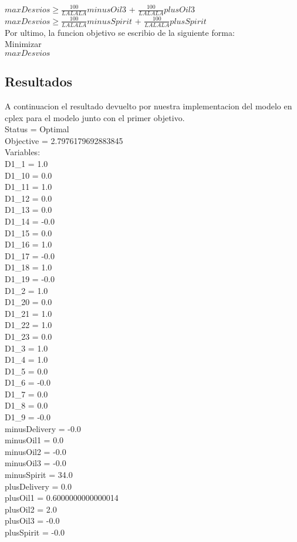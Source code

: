 $maxDesvios \geq \frac{100}{LALALA} minusOil3$ +
$\frac{100}{LALALA} plusOil3$ \\


$maxDesvios \geq \frac{100}{LALALA} minusSpirit$ +
$\frac{100}{LALALA} plusSpirit$ \\

 Por ultimo, la funcion objetivo se escribio de la siguiente forma: \\

 Minimizar\\
 $maxDesvios$

\newpage
\subsection{Resultados}

A continuacion el resultado devuelto por nuestra implementacion del modelo en cplex para el modelo junto con el primer objetivo.\\


Status = Optimal \\
Objective = 2.7976179692883845 \\
Variables: \\
D1\_1 = 1.0 \\
D1\_10 = 0.0 \\
D1\_11 = 1.0 \\
D1\_12 = 0.0 \\
D1\_13 = 0.0 \\
D1\_14 = -0.0 \\
D1\_15 = 0.0 \\
D1\_16 = 1.0 \\
D1\_17 = -0.0 \\
D1\_18 = 1.0 \\
D1\_19 = -0.0 \\
D1\_2 = 1.0 \\
D1\_20 = 0.0 \\
D1\_21 = 1.0 \\
D1\_22 = 1.0 \\
D1\_23 = 0.0 \\
D1\_3 = 1.0 \\
D1\_4 = 1.0 \\
D1\_5 = 0.0 \\
D1\_6 = -0.0 \\
D1\_7 = 0.0 \\
D1\_8 = 0.0 \\
D1\_9 = -0.0 \\
minusDelivery = -0.0 \\
minusOil1 = 0.0 \\
minusOil2 = -0.0 \\
minusOil3 = -0.0 \\
minusSpirit = 34.0 \\
plusDelivery = 0.0 \\
plusOil1 = 0.6000000000000014 \\
plusOil2 = 2.0 \\
plusOil3 = -0.0 \\
plusSpirit = -0.0 \\


